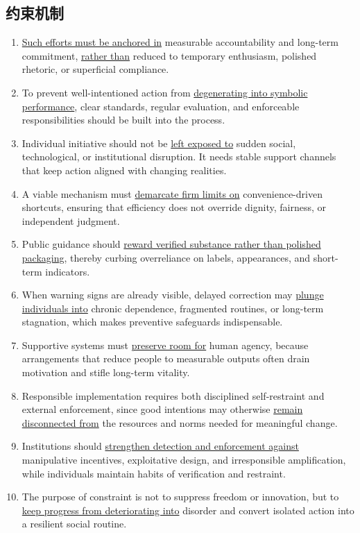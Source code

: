 \subsection{约束机制}

\begin{enumerate}
    \item \underline{Such efforts must be anchored in} measurable accountability and long-term commitment, \underline{rather than} reduced to  temporary enthusiasm, polished rhetoric, or superficial compliance.

    \item To prevent well-intentioned action from \underline{degenerating into symbolic performance}, clear standards, regular evaluation, and enforceable responsibilities should be built into the process.

    \item Individual initiative should not be \underline{left exposed to} sudden social, technological, or institutional disruption. It needs stable support channels that keep action aligned with changing realities.

    \item A viable mechanism must \underline{demarcate firm limits on} convenience-driven shortcuts, ensuring that efficiency does not override dignity, fairness, or independent judgment.

    \item Public guidance should \underline{reward verified substance rather than polished packaging}, thereby curbing overreliance on labels, appearances, and short-term indicators.

    \item When warning signs are already visible, delayed correction may \underline{plunge individuals into} chronic dependence, fragmented routines, or long-term stagnation, which makes preventive safeguards indispensable.

    \item Supportive systems must \underline{preserve room for} human agency, because arrangements that reduce people to measurable outputs often drain motivation and stifle long-term vitality.

    \item Responsible implementation requires both disciplined self-restraint and external enforcement, since good intentions may otherwise \underline{remain disconnected from} the resources and norms needed for meaningful change.

    \item Institutions should \underline{strengthen detection and enforcement against} manipulative incentives, exploitative design, and irresponsible amplification, while individuals maintain habits of verification and restraint.

    \item The purpose of constraint is not to suppress freedom or innovation, but to \underline{keep progress from deteriorating into} disorder and convert isolated action into a resilient social routine.
\end{enumerate}


